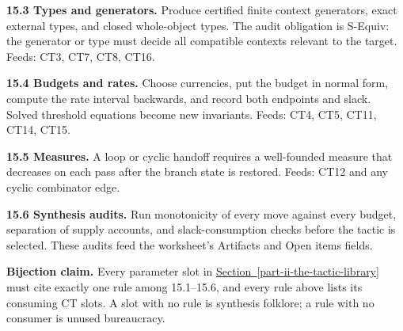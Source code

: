\documentclass[
  11pt,
]{article}
\theoremstyle{definition}
\newcommand{\secref}[1]{\hyperref[#1]{Section~\ref*{#1}}}
\begin{document}
\textbf{15.3 Types and generators.} Produce certified finite context
generators, exact external types, and closed whole-object types. The
audit obligation is S-Equiv: the generator or type must decide all
compatible contexts relevant to the target. Feeds: CT3, CT7, CT8, CT16.

\textbf{15.4 Budgets and rates.} Choose currencies, put the budget in
normal form, compute the rate interval backwards, and record both
endpoints and slack. Solved threshold equations become new invariants.
Feeds: CT4, CT5, CT11, CT14, CT15.

\textbf{15.5 Measures.} A loop or cyclic handoff requires a
well-founded measure that decreases on each pass after the branch state
is restored. Feeds: CT12 and any cyclic combinator edge.

\textbf{15.6 Synthesis audits.} Run monotonicity of every move against
every budget, separation of supply accounts, and slack-consumption
checks before the tactic is selected. These audits feed the worksheet's
Artifacts and Open items fields.

\textbf{Bijection claim.} Every parameter slot in \secref{part-ii-the-tactic-library} must cite exactly
one rule among 15.1--15.6, and every rule above lists its consuming CT
slots. A slot with no rule is synthesis folklore; a rule with no
consumer is unused bureaucracy.
\end{document}
